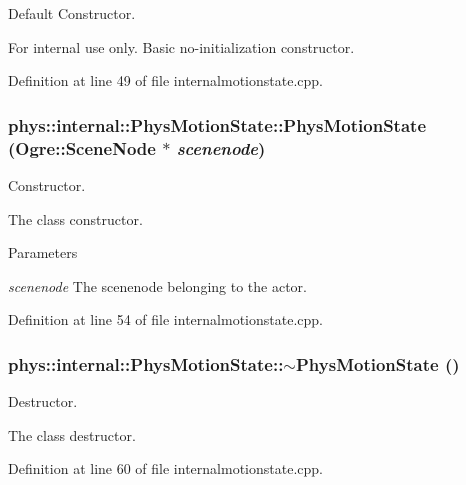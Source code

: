 Default Constructor. 

\begin{DoxyInternal}{For internal use only.}
Basic no-\/initialization constructor. \end{DoxyInternal}


Definition at line 49 of file internalmotionstate.cpp.

\hypertarget{classphys_1_1internal_1_1PhysMotionState_a604ffb6d4d121ec548d780a515f77dc6}{
\subsubsection[{PhysMotionState}]{\setlength{\rightskip}{0pt plus 5cm}phys::internal::PhysMotionState::PhysMotionState (Ogre::SceneNode $\ast$ {\em scenenode})}}
\label{dc/df8/classphys_1_1internal_1_1PhysMotionState_a604ffb6d4d121ec548d780a515f77dc6}


Constructor. 

The class constructor. 
\begin{DoxyParams}{Parameters}
\item[{\em scenenode}]The scenenode belonging to the actor. \end{DoxyParams}


Definition at line 54 of file internalmotionstate.cpp.

\hypertarget{classphys_1_1internal_1_1PhysMotionState_a46f94854cc2d758a2adae412dea6def7}{
\subsubsection[{$\sim$PhysMotionState}]{\setlength{\rightskip}{0pt plus 5cm}phys::internal::PhysMotionState::$\sim$PhysMotionState ()}}
\label{dc/df8/classphys_1_1internal_1_1PhysMotionState_a46f94854cc2d758a2adae412dea6def7}


Destructor. 

The class destructor. 

Definition at line 60 of file internalmotionstate.cpp.



